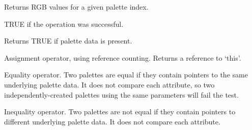 Returns RGB values for a given palette index.







TRUE if the operation was successful.



\label{wxpaletteok}


Returns TRUE if palette data is present.

\label{wxpaletteassignment}


Assignment operator, using reference counting. Returns a reference
to `this'.

\label{wxpaletteequals}


Equality operator. Two palettes are equal if they contain pointers
to the same underlying palette data. It does not compare each attribute,
so two independently-created palettes using the same parameters will
fail the test.

\label{wxpalettenotequals}


Inequality operator. Two palettes are not equal if they contain pointers
to different underlying palette data. It does not compare each attribute.


